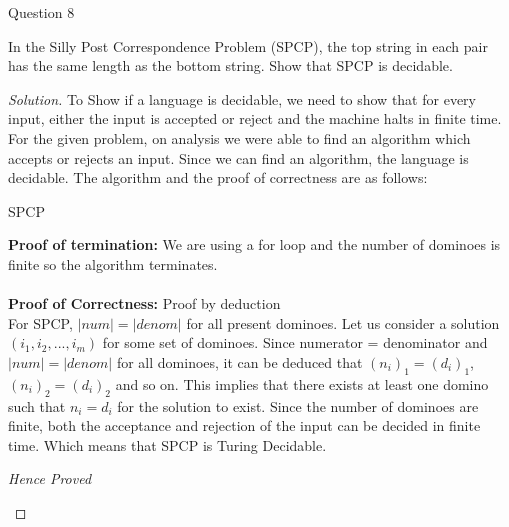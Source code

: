 \begin{solution}{Question 8}\label{ques:8}
    \begin{question}
        In the Silly Post Correspondence Problem (SPCP), the top string in each pair has the same length as the bottom string. Show that SPCP is decidable.
    \end{question}
    \tcblower{}
    \begin{proof}[Solution]
        To Show if a language is decidable, we need to show that for every input, either the input is accepted or reject and the machine halts in finite time.\\
        For the given problem, on analysis we were able to find an algorithm which accepts or rejects an input. Since we can find an algorithm, the language is decidable. The algorithm and the proof of correctness are as follows:
        \begin{algorithm}[H]
          \caption{SPCP}
          \label{alg:8}
          \begin{algorithmic}[1]
             
               
              \EndIf{}
            \EndFor{}
            \EndProcedure{}
          \end{algorithmic}
        \end{algorithm}
        \textbf{Proof of termination:} We are using a for loop and the number of dominoes is finite so the algorithm terminates.\\
        \\
        \textbf{Proof of Correctness:} Proof by deduction\\
        For SPCP, $|num|= |denom|$ for all present dominoes. Let us consider a solution $(i_1, i_2, ..., i_m)$ for some set of dominoes. Since numerator = denominator and $|num|= |denom|$ for all dominoes, it can be deduced that $(n_i)_1 = (d_i)_1$, $(n_i)_2 = (d_i)_2$ and so on. This implies that there exists at least one domino such that $n_i = d_i$ for the solution to exist. Since the number of dominoes are finite, both the acceptance and rejection of the input can be decided in finite time. Which means that SPCP is Turing Decidable.
        \begin{center}
        \textit{Hence Proved}
        \end{center}
    \end{proof}
\end{solution}
